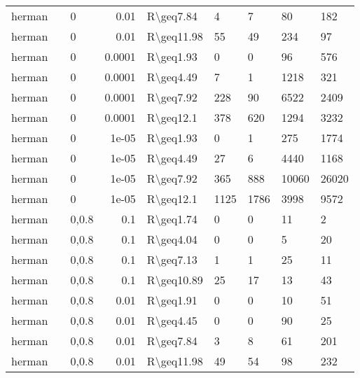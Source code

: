 \begin{longtable}{lllrlllll}
 herman        &           & 0     & 0.01   & R\textbackslash{}geq7.84  & 4    & 7    & 80       & 182     \\
 herman        &           & 0     & 0.01   & R\textbackslash{}geq11.98 & 55   & 49   & 234      & 97      \\
 herman        &           & 0     & 0.0001 & R\textbackslash{}geq1.93  & 0    & 0    & 96       & 576     \\
 herman        &           & 0     & 0.0001 & R\textbackslash{}geq4.49  & 7    & 1    & 1218     & 321     \\
 herman        &           & 0     & 0.0001 & R\textbackslash{}geq7.92  & 228  & 90   & 6522     & 2409    \\
 herman        &           & 0     & 0.0001 & R\textbackslash{}geq12.1  & 378  & 620  & 1294     & 3232    \\
 herman        &           & 0     & 1e-05  & R\textbackslash{}geq1.93  & 0    & 1    & 275      & 1774    \\
 herman        &           & 0     & 1e-05  & R\textbackslash{}geq4.49  & 27   & 6    & 4440     & 1168    \\
 herman        &           & 0     & 1e-05  & R\textbackslash{}geq7.92  & 365  & 888  & 10060    & 26020   \\
 herman        &           & 0     & 1e-05  & R\textbackslash{}geq12.1  & 1125 & 1786 & 3998     & 9572    \\
 herman        &           & 0,0.8 & 0.1    & R\textbackslash{}geq1.74  & 0    & 0    & 11       & 2       \\
 herman        &           & 0,0.8 & 0.1    & R\textbackslash{}geq4.04  & 0    & 0    & 5        & 20      \\
 herman        &           & 0,0.8 & 0.1    & R\textbackslash{}geq7.13  & 1    & 1    & 25       & 11      \\
 herman        &           & 0,0.8 & 0.1    & R\textbackslash{}geq10.89 & 25   & 17   & 13       & 43      \\
 herman        &           & 0,0.8 & 0.01   & R\textbackslash{}geq1.91  & 0    & 0    & 10       & 51      \\
 herman        &           & 0,0.8 & 0.01   & R\textbackslash{}geq4.45  & 0    & 0    & 90       & 25      \\
 herman        &           & 0,0.8 & 0.01   & R\textbackslash{}geq7.84  & 3    & 8    & 61       & 201     \\
 herman        &           & 0,0.8 & 0.01   & R\textbackslash{}geq11.98 & 49   & 54   & 98       & 232     \\

\end{longtable}
